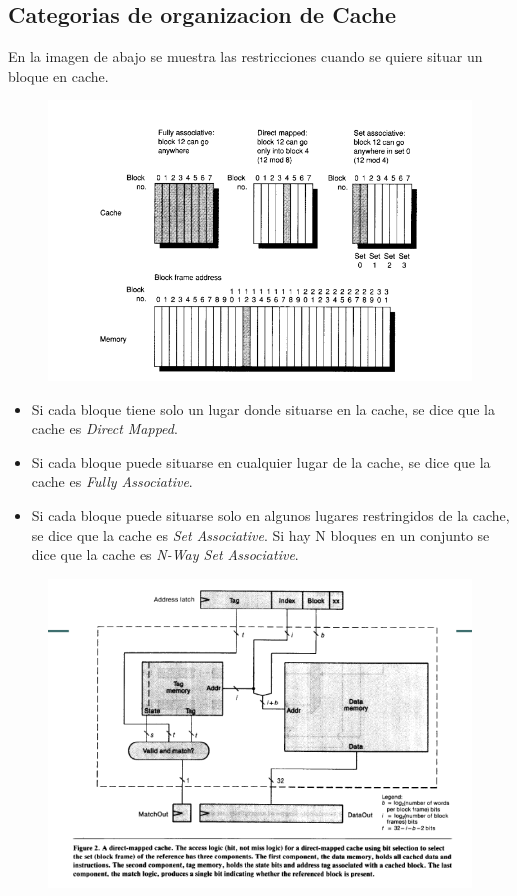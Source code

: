 \documentclass{article}
\begin{document}
\subsection{Categorias de organizacion de Cache}

En la imagen de abajo se muestra las restricciones cuando se quiere situar un bloque en cache.


\begin{figure}[h!]
    \includegraphics[width=\linewidth]{imagenes/CategoriasCache.png}
\end{figure}


\begin{itemize} 
    \item Si cada bloque tiene solo un lugar donde situarse en la cache, se dice que la cache es \textit{Direct Mapped}.
    \item Si cada bloque puede situarse en cualquier lugar de la cache, se dice que la cache es \textit{Fully Associative}.
    \item Si cada bloque puede situarse solo en algunos lugares restringidos de la cache, se dice que la cache es \textit{Set Associative}. Si hay N bloques en un conjunto se dice que la cache es \textit{N-Way Set Associative}.
\end{itemize}

\begin{figure}[h!]
    \includegraphics[width=\linewidth]{imagenes/CacheMapeoDirecto.png}
\end{figure}
\end{document}
